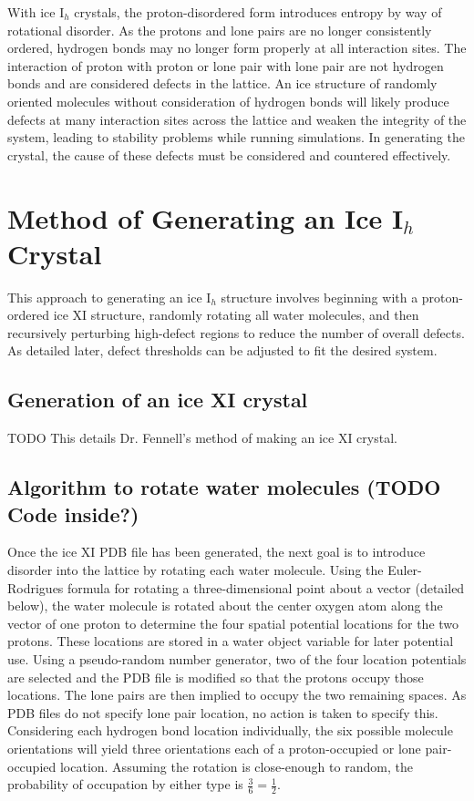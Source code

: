 With ice I$_{h}$ crystals, the proton-disordered form introduces entropy by way of rotational disorder. 
As the protons and lone pairs are no longer consistently ordered, hydrogen bonds may no longer form properly at all interaction sites. 
The interaction of proton with proton or lone pair with lone pair are not hydrogen bonds and are considered defects in the lattice. 
An ice structure of randomly oriented molecules without consideration of hydrogen bonds will likely produce defects at many interaction sites across the lattice and weaken the integrity of the system, leading to stability problems while running simulations. 
In generating the crystal, the cause of these defects must be considered and countered effectively.

\section{Method of Generating an Ice I$_{h}$ Crystal}
This approach to generating an ice I$_{h}$ structure involves beginning with a proton- ordered ice XI structure, randomly rotating all water molecules, and then recursively perturbing high-defect regions to reduce the number of overall defects. 
As detailed later, defect thresholds can be adjusted to fit the desired system.
\subsection{Generation of an ice XI crystal}
TODO
This details Dr. Fennell’s method of making an ice XI crystal.
\subsection{Algorithm to rotate water molecules (TODO Code inside?)}
Once the ice XI PDB file has been generated, the next goal is to introduce disorder into the lattice by rotating each water molecule. 
Using the Euler-Rodrigues formula for rotating a three-dimensional point about a vector (detailed below), the water molecule is rotated about the center oxygen atom along the vector of one proton to determine the four spatial potential locations for the two protons. 
These locations are stored in a water object variable for later potential use.
Using a pseudo-random number generator, two of the four location potentials are selected and the PDB file is modified so that the protons occupy those locations. 
The lone pairs are then implied to occupy the two remaining spaces. 
As PDB files do not specify lone pair location, no action is taken to specify this. 
Considering each hydrogen bond location individually, the six possible molecule orientations will yield three orientations each of a proton-occupied or lone pair-occupied location. 
Assuming the rotation is close-enough to random, the probability of occupation by either type is $\frac{3}{6} = \frac{1}{2}$.

